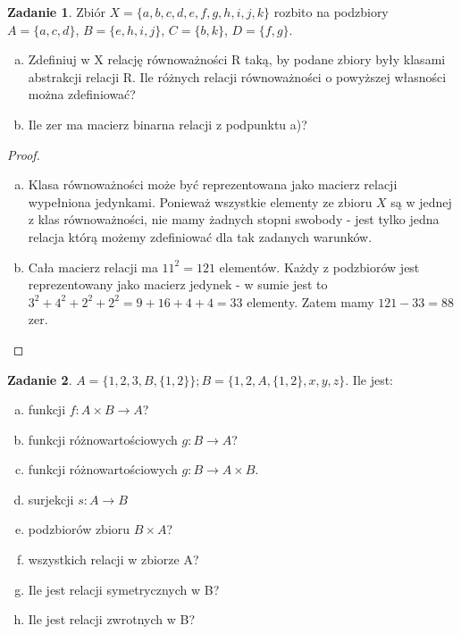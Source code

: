 \documentclass[11pt]{article}
\theoremstyle{definition}
\newtheorem{zadanie}{Zadanie}
\numberwithin{zadanie}{subsection}
\begin{document}
\begin{zadanie}
    Zbiór $X=\{a,b,c,d,e,f,g,h,i,j,k\}$ rozbito na podzbiory $A=\{a,c,d\}$, $B=\{e,h,i,j\}$, $C=\{b,k\}$, $D=\{f,g\}$.

    \begin{enumerate}[a)]
        \item Zdefiniuj w X relację równoważności R taką, by podane zbiory były klasami abstrakcji relacji R. Ile różnych relacji równoważności o powyższej własności można zdefiniować?
        \item Ile zer ma macierz binarna relacji z podpunktu a)?
    \end{enumerate}
\end{zadanie}
\begin{proof}
    \begin{enumerate}[a)]
        \item Klasa równoważności może być reprezentowana jako macierz relacji wypełniona jedynkami. Ponieważ wszystkie elementy ze zbioru $X$ są w jednej z klas równoważności, nie mamy żadnych stopni swobody - jest tylko jedna relacja którą możemy zdefiniować dla tak zadanych warunków.
        \item Cała macierz relacji ma $11^2=121$ elementów. Każdy z podzbiorów jest reprezentowany jako macierz jedynek - w sumie jest to $3^2+4^2+2^2+2^2 = 9+16+4+4=33$ elementy. Zatem mamy $121-33 = 88$ zer.
    \end{enumerate}
\end{proof}
\begin{zadanie}
    $A = \{1,2,3,B,\{1,2\}\}; B = \{1,2,A,\{1,2\},x,y,z\}.$ Ile jest:

    \begin{enumerate}[a)]
        \item funkcji $f: A\times B\to A$?
        \item funkcji różnowartościowych $g: B\to A$?
        \item funkcji różnowartościowych $g: B\to A\times B$.
        \item surjekcji $s:A\to B$
        \item podzbiorów zbioru $B\times A$?
        \item wszystkich relacji w zbiorze A?
        \item Ile jest relacji symetrycznych w B?
        \item Ile jest relacji zwrotnych w B?
    \end{enumerate}

\end{zadanie}
\end{document}
